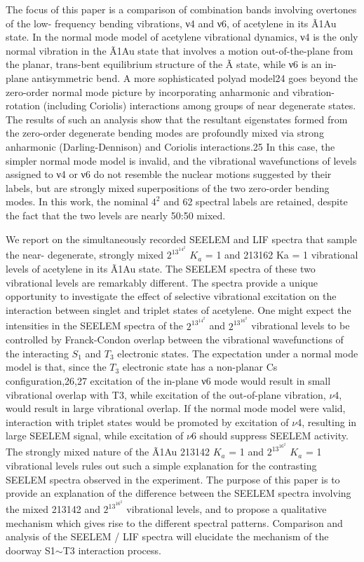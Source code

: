 \documentclass[12pt,draft]{mitthesis}
\begin{document}
The focus of this paper is a comparison of combination bands involving
overtones of the low- frequency bending vibrations, ν4 and ν6, of
acetylene in its Ã1Au state. In the normal mode model of acetylene
vibrational dynamics, ν4 is the only normal vibration in the Ã1Au
state that involves a motion out-of-the-plane from the planar,
trans-bent equilibrium structure of the Ã state, while ν6 is an
in-plane antisymmetric bend. A more sophisticated polyad model24 goes
beyond the zero-order normal mode picture by incorporating anharmonic
and vibration-rotation (including Coriolis) interactions among groups
of near degenerate states. The results of such an analysis show that
the resultant eigenstates formed from the zero-order degenerate
bending modes are profoundly mixed via strong anharmonic
(Darling-Dennison) and Coriolis interactions.25 In this case, the
simpler normal mode model is invalid, and the vibrational
wavefunctions of levels assigned to ν4 or ν6 do not resemble the
nuclear motions suggested by their labels, but are strongly mixed
superpositions of the two zero-order bending modes.  In this work, the
nominal $4^2$ and 62 spectral labels are retained, despite the fact that
the two levels are nearly 50:50 mixed.

We report on the simultaneously recorded SEELEM and LIF spectra that
sample the near- degenerate, strongly mixed $2^13^14^2$ $K_a$ = 1 and 213162
Ka = 1 vibrational levels of acetylene in its Ã1Au state. The SEELEM
spectra of these two vibrational levels are remarkably different. The
spectra provide a unique opportunity to investigate the effect of
selective vibrational excitation on the interaction between singlet
and triplet states of acetylene. One might expect the intensities in
the SEELEM spectra of the $2^13^14^2$ and $2^13^16^2$ vibrational levels to be
controlled by Franck-Condon overlap between the vibrational
wavefunctions of the interacting $S_1$ and $T_3$ electronic states. The
expectation under a normal mode model is that, since the $T_3$ electronic
state has a non-planar Cs configuration,26,27 excitation of the
in-plane ν6 mode would result in small vibrational overlap with T3,
while excitation of the out-of-plane vibration, $\nu$4, would result in
large vibrational overlap. If the normal mode model were valid,
interaction with triplet states would be promoted by excitation
of $\nu$4, resulting in large SEELEM signal, while excitation of $\nu$6
should suppress SEELEM activity. The strongly mixed nature of the Ã1Au
213142 $K_a$ = 1 and $2^13^16^2$ $K_a$ = 1 vibrational levels rules out such a
simple explanation for the contrasting SEELEM spectra observed in the
experiment. The purpose of this paper is to provide an explanation of
the difference between the SEELEM spectra involving the mixed 213142
and $2^13^16^2$ vibrational levels, and to propose a qualitative mechanism
which gives rise to the different spectral patterns. Comparison and
analysis of the SEELEM / LIF spectra will elucidate the mechanism of
the doorway S1$\sim$T3 interaction process.
\end{document}
